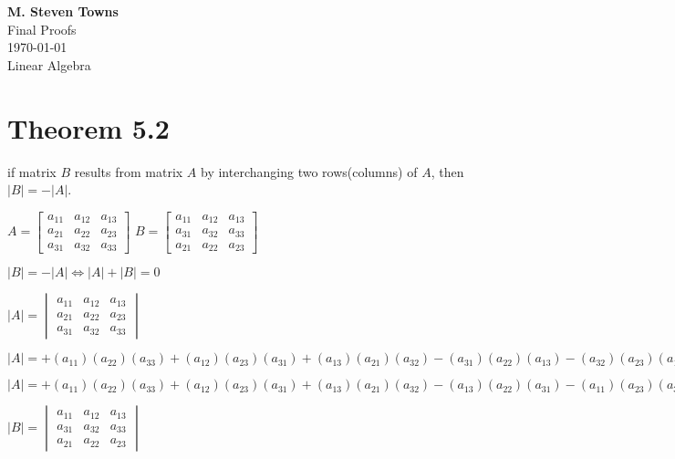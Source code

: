 \documentclass{report}
\begin{document}
\begin{center}
\textbf{M. Steven Towns}\\
Final Proofs\\
\today\\
Linear Algebra\\

\end{center}
\hrulefill
\section*{Theorem 5.2}
if matrix $B$ results from matrix $A$ by interchanging two rows(columns) of $A$, then $|B|=-|A|$. 
\begin{center}
$ 	A=
	\begin{bmatrix}
		a_{11} & a_{12} & a_{13}\\
		a_{21} & a_{22} & a_{23}\\
		a_{31} & a_{32} & a_{33}
	\end{bmatrix}	
$
$	B=
	\begin{bmatrix}
		a_{11} & a_{12} & a_{13}\\
		a_{31} & a_{32} & a_{33}\\
		a_{21} & a_{22} & a_{23}
	\end{bmatrix}
$
\end{center}
\begin{center}
$|B|=-|A| \iff |A|+|B|=0$
\end{center}
\begin{center}
$	|A|=
	\begin{vmatrix}
		a_{11} & a_{12} & a_{13}\\
		a_{21} & a_{22} & a_{23}\\
		a_{31} & a_{32} & a_{33}
	\end{vmatrix}
$
\end{center}
\begin{center}
$
	|A|=+(a_{11})(a_{22})(a_{33})+(a_{12})(a_{23})(a_{31})+(a_{13})(a_{21})(a_{32})	
	-(a_{31})(a_{22})(a_{13})-(a_{32})(a_{23})(a_{11})-(a_{33})(a_{21})(a_{12})
$
\end{center}
\begin{center}
$
	|A|=+(a_{11})(a_{22})(a_{33})+(a_{12})(a_{23})(a_{31})+(a_{13})(a_{21})(a_{32})
	-(a_{13})(a_{22})(a_{31})-(a_{11})(a_{23})(a_{32})-(a_{12})(a_{21})(a_{33})
$
\end{center}
\vspace{5mm}
\begin{center}
$	|B|=
	\begin{vmatrix}
		a_{11} & a_{12} & a_{13}\\
		a_{31} & a_{32} & a_{33}\\
		a_{21} & a_{22} & a_{23}
	\end{vmatrix}
$
\end{center}
\end{document}
